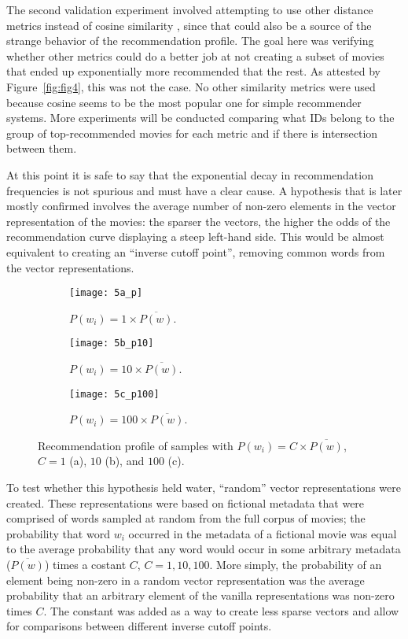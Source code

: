 The second validation experiment involved attempting to use other distance
metrics instead of cosine similarity \citep{ricci_introduction_2011}, since that
could also be a source of the strange behavior of the recommendation profile.
The goal here was verifying whether other metrics could do a better job at not
creating a subset of movies that ended up exponentially more recommended that
the rest. As attested by Figure~\ref{fig:fig4}, this was not the case. No other
similarity metrics were used because cosine seems to be the most popular one for
simple recommender systems. More experiments will be conducted comparing what
IDs belong to the group of top-recommended movies for each metric and if there
is intersection between them.

At this point it is safe to say that the exponential decay in recommendation
frequencies is not spurious and must have a clear cause. A hypothesis that is
later mostly confirmed involves the average number of non-zero elements in the
vector representation of the movies: the sparser the vectors, the higher the
odds of the recommendation curve displaying a steep left-hand side. This would
be almost equivalent to creating an ``inverse cutoff point'', removing common
words from the vector representations.

\begin{figure}
  \centering
  \begin{subfigure}{0.3\textwidth}
    \centering
    \texttt{[image: 5a\_p]}
    \caption{$P(w_{i}) = 1 \times \overline{P(w)}$.\label{fig:fig5a}}
  \end{subfigure}
  \begin{subfigure}{0.3\textwidth}
    \centering
    \texttt{[image: 5b\_p10]}
    \caption{$P(w_{i}) = 10 \times \overline{P(w)}$.\label{fig:fig5b}}
  \end{subfigure}
  \begin{subfigure}{0.3\textwidth}
    \centering
    \texttt{[image: 5c\_p100]}
    \caption{$P(w_{i}) = 100 \times \overline{P(w)}$.\label{fig:fig5c}}
  \end{subfigure}
  \caption{Recommendation profile of samples with
    $P(w_{i}) = C \times \overline{P(w)}$, $C = 1$ (a), $10$ (b), and $100$
    (c).\label{fig:fig5}}
\end{figure}

To test whether this hypothesis held water, ``random'' vector representations
were created. These representations were based on fictional metadata that were
comprised of words sampled at random from the full corpus of movies; the
probability that word $w_{i}$ occurred in the metadata of a fictional movie was
equal to the average probability that any word would occur in some arbitrary
metadata ($\overline{P(w)}$) times a costant $C$, $C = {1, 10, 100}$. More
simply, the probability of an element being non-zero in a random vector
representation was the average probability that an arbitrary element of the
vanilla representations was non-zero times $C$. The constant was added as a way
to create less sparse vectors and allow for comparisons between different
inverse cutoff points.

